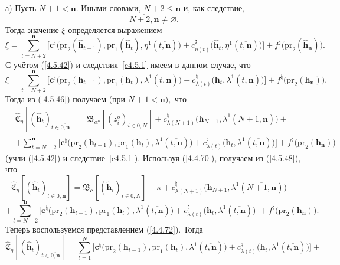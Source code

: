 \documentclass[12pt]{report}
\newcommand{\ov}{\overline}
\newcommand{\la}{\lambda}
\newcommand{\al}{\alpha}
\newcommand{\emp}{\varnothing}
\begin{document}
{{а) Пусть $N+1 <\mathbf{n}.$ Иными словами, $N+2\leqslant \mathbf{n}$ и, как следствие,
$$
\ov{N+2,\mathbf{n}}\neq \emp.
$$
Тогда значение $\xi$ определяется выражением
$$
\xi = \sum\limits_{t=N+2}^\mathbf{n}\bigl[\mathbf{c}^\natural\bigl(\mathrm{pr}_2(\hat{\mathbf{h}}_{t-1}),
\mathrm{pr}_1(\hat{\mathbf{h}}_t),\eta^1(\ov{t,\mathbf{n}})\bigl) +
c_{\eta(t)}^\natural\bigl(\hat{\mathbf{h}}_t,\eta^1(\ov{t,\mathbf{n}})\bigl)\bigl] +
f^\natural\bigl(\mathrm{pr}_2(\hat{\mathbf{h}}_\mathbf{n})\bigl).
$$
С учётом (\ref{4.5.42}) и следствия~\ref{c4.5.1} имеем в данном случае, что
$$
\xi = \sum\limits_{t=N+2}^\mathbf{n}\bigl[\mathbf{c}^\natural\bigl(\mathrm{pr}_2(\mathbf{h}_{t-1}),
\mathrm{pr}_1(\mathbf{h}_t),\la^1(\ov{t,\mathbf{n}})\bigl) +
c_{\la(t)}^\natural\bigl(\mathbf{h}_t,\la^1(\ov{t,\mathbf{n}})\bigl)\bigl] +
f^\natural\bigl(\mathrm{pr}_2(\mathbf{h}_\mathbf{n})\bigl).
$$
Тогда из (\ref{4.5.46}) получаем (при $N+1 < \mathbf{n}),$ что
\begin{eqnarray}
&\widehat{\mathfrak{C}}_\eta[(\hat{\mathbf{h}}_t)_{t\in\ov{0,\mathbf{n}}}] =
\mathfrak{B}_{\al^o}[(z_i^o)_{i\in\ov{0,N}}] +
c_{\la(N+1)}^\natural\bigl(\mathbf{h}_{N+1},\la^1(\ov{N+1,\mathbf{n}})\bigl)  +
&\nonumber\\
&+ \sum\limits_{t=N+2}^\mathbf{n}\bigl[\mathbf{c}^\natural\bigl(\mathrm{pr}_2(\mathbf{h}_{t-1}),
\mathrm{pr}_1(\mathbf{h}_t),\la^1(\ov{t,\mathbf{n}})\bigl) +
c_{\la(t)}^\natural\bigl(\mathbf{h}_t,\la^1(\ov{t,\mathbf{n}})\bigl)\bigl] +
f^\natural\bigl(\mathrm{pr}_2(\mathbf{h}_\mathbf{n})\bigl)
&\label{4.5.48}
\end{eqnarray}
(учли (\ref{4.5.42}) и следствие~\ref{c4.5.1}).  Используя (\ref{4.4.70}),
получаем из (\ref{4.5.48}), что
$$
\widehat{\mathfrak{C}}_\eta[(\hat{\mathbf{h}}_t)_{t\in\ov{0,\mathbf{n}}}] =
\mathfrak{B}_\mathbf{e}[(\tilde{\mathbf{h}}_i)_{i\in\ov{0,N}}] -\kappa +
c_{\la(N+1)}^\natural\bigl(\mathbf{h}_{N+1},\la^1(\ov{N+1,\mathbf{n}})\bigl) +
$$
$$
+ \sum\limits_{t=N+2}^\mathbf{n}\bigl[\mathbf{c}^\natural\bigl(\mathrm{pr}_2(\mathbf{h}_{t-1}),
\mathrm{pr}_1(\mathbf{h}_t),\la^1(\ov{t,\mathbf{n}})\bigl) +
c_{\la(t)}^\natural\bigl(\mathbf{h}_t,\la^1(\ov{t,\mathbf{n}})\bigl)\bigl] +
f^\natural\bigl(\mathrm{pr}_2(\mathbf{h}_\mathbf{n})\bigl).
$$
Теперь воспользуемся  представлением (\ref{4.4.72}). Тогда
$$
\widehat{\mathfrak{C}}_\eta[(\hat{\mathbf{h}}_t)_{t\in\ov{0,\mathbf{n}}}] =
\sum\limits_{t=1}^N\bigl[\mathbf{c}^\natural\bigl(\mathrm{pr}_2(\mathbf{h}_{t-1}),
\mathrm{pr}_1(\mathbf{h}_t),\la^1(\ov{t,\mathbf{n}})\bigl) +
c_{\la(t)}^\natural\bigl(\mathbf{h}_t,\la^1(\ov{t,\mathbf{n}})\bigl)\bigl] +
$$}}
\end{document}
